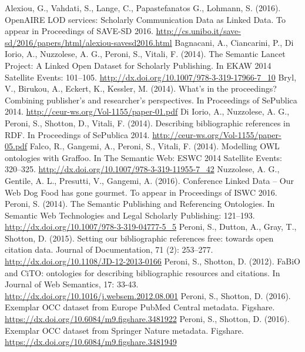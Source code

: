 \documentclass[runningheads,a4paper]{llncs}
\begin{document}
\begin{thebibliography}{4}

 Alexiou, G., Vahdati, S., Lange, C., Papastefanatos G., Lohmann, S. (2016). OpenAIRE LOD services: Scholarly Communication Data as Linked Data. To appear in Proceedings of SAVE-SD 2016. \url{http://cs.unibo.it/save-sd/2016/papers/html/alexiou-savesd2016.html}
 Bagnacani, A., Ciancarini, P., Di Iorio, A., Nuzzolese, A. G., Peroni, S., Vitali, F. (2014). The Semantic Lancet Project: A Linked Open Dataset for Scholarly Publishing. In EKAW 2014 Satellite Events: 101--105. \url{http://dx.doi.org/10.1007/978-3-319-17966-7\_10}
 Bryl, V., Birukou, A., Eckert, K., Kessler, M. (2014). What's in the proceedings? Combining publisher's and researcher's perspectives. In Proceedings of SePublica 2014. \url{http://ceur-ws.org/Vol-1155/paper-01.pdf}
 Di Iorio, A., Nuzzolese, A. G., Peroni, S., Shotton, D., Vitali, F. (2014). Describing bibliographic references in RDF. In Proceedings of SePublica 2014. \url{http://ceur-ws.org/Vol-1155/paper-05.pdf}
 Falco, R., Gangemi, A., Peroni, S., Vitali, F. (2014). Modelling OWL ontologies with Graffoo. In The Semantic Web: ESWC 2014 Satellite Events: 320--325. \url{http://dx.doi.org/10.1007/978-3-319-11955-7\_42}
 Nuzzolese, A. G., Gentile, A. L., Presutti, V., Gangemi, A. (2016). Conference Linked Data -- Our Web Dog Food has gone gourmet. To appear in Proceedings of ISWC 2016.
 Peroni, S. (2014). The Semantic Publishing and Referencing Ontologies. In Semantic Web Technologies and Legal Scholarly Publishing: 121--193. \url{http://dx.doi.org/10.1007/978-3-319-04777-5\_5}
 Peroni, S., Dutton, A., Gray, T., Shotton, D. (2015). Setting our bibliographic references free: towards open citation data. Journal of Documentation, 71 (2): 253--277. \url{http://dx.doi.org/10.1108/JD-12-2013-0166}
 Peroni, S., Shotton, D. (2012). FaBiO and CiTO: ontologies for describing bibliographic resources and citations. In Journal of Web Semantics, 17: 33-43. \url{http://dx.doi.org/10.1016/j.websem.2012.08.001}
 Peroni, S., Shotton, D. (2016). Exemplar OCC dataset from Europe PubMed Central metadata. Figshare. \url{https://dx.doi.org/10.6084/m9.figshare.3481922}
 Peroni, S., Shotton, D. (2016). Exemplar OCC dataset from Springer Nature metadata. Figshare. \url{https://dx.doi.org/10.6084/m9.figshare.3481949}

\end{thebibliography}
\end{document}
